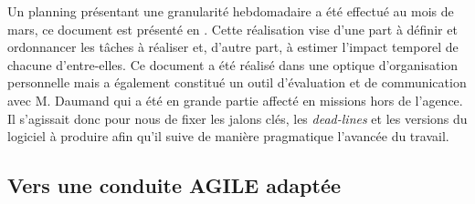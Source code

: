   Un planning présentant une granularité hebdomadaire a été effectué au mois de mars, ce document est présenté en .
  Cette réalisation vise d'une part à définir et ordonnancer les tâches à réaliser et, d'autre part, à estimer l'impact temporel de chacune d'entre-elles. 
  Ce document a été réalisé dans une optique d'organisation personnelle mais a également constitué un outil d'évaluation et de communication avec M. Daumand qui a été en grande partie affecté en missions hors de l'agence. 
  Il s'agissait donc pour nous de fixer les jalons clés, les \emph{dead-lines} et les versions du logiciel à produire afin qu'il suive de manière pragmatique l'avancée du travail. 
  
  \subsection{Vers une conduite AGILE adaptée}
  
